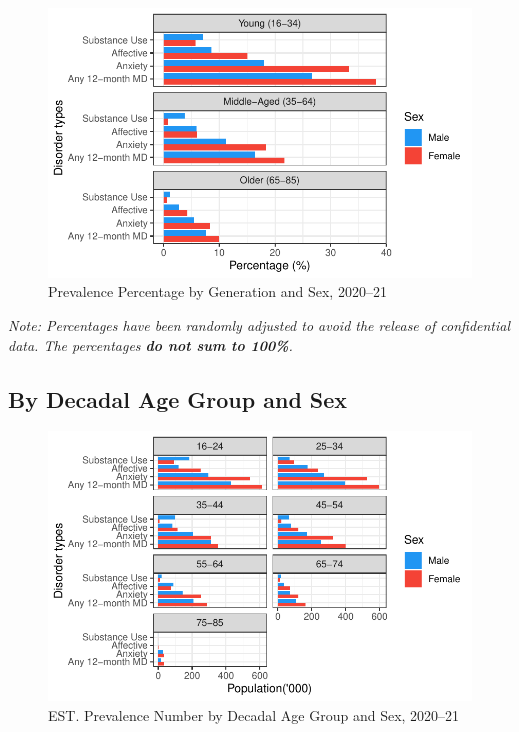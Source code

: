 \documentclass[
  a4paper,
  DIV=11,
  numbers=noendperiod]{scrreport}
\begin{document}
\begin{figure}

\caption{\label{fig-12gsp}Prevalence Percentage by Generation and Sex,
2020--21}

{\centering \includegraphics{./chap1-prevalence-of-md_files/figure-pdf/fig-12gsp-1.pdf}

}

\end{figure}

\emph{Note: Percentages have been randomly adjusted to avoid the release
of confidential data. The percentages \textbf{do not sum to 100\%}.}

\hypertarget{by-decadal-age-group-and-sex}{%
\subsection{By Decadal Age Group and
Sex}\label{by-decadal-age-group-and-sex}}

\begin{figure}

\caption{\label{fig-12dgn}EST. Prevalence Number by Decadal Age Group
and Sex, 2020--21}

{\centering \includegraphics{./chap1-prevalence-of-md_files/figure-pdf/fig-12dgn-1.pdf}

}

\end{figure}
\end{document}
